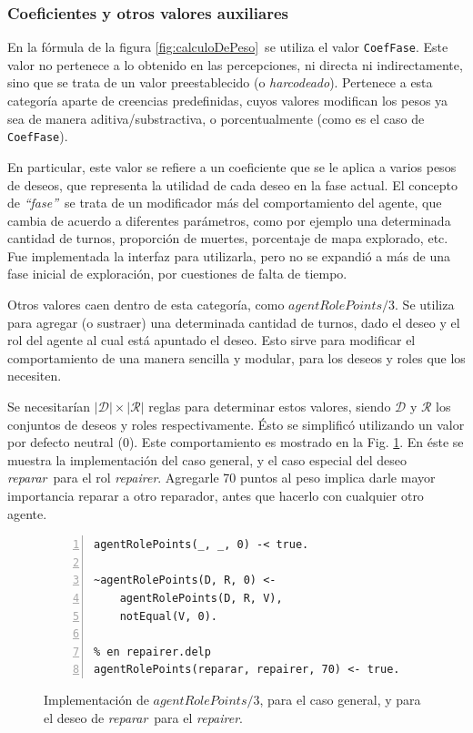 \documentclass[oneside]{book}
\theoremstyle{definition}
\newcommand{\lit}[1]{\mbox{$ #1$}}
\begin{document}
\subsubsection{Coeficientes y otros valores auxiliares}

En la fórmula de la figura \ref{fig:calculoDePeso}\ se utiliza el valor 
\texttt{CoefFase}. Este valor no pertenece a lo obtenido en las percepciones, ni
directa ni indirectamente, sino que se trata de un valor preestablecido (o
\textit{harcodeado}). Pertenece a esta categoría aparte de creencias predefinidas,
cuyos valores modifican los pesos ya sea de manera aditiva/substractiva, o 
porcentualmente (como es el caso de \texttt{CoefFase}).

En particular, este valor se refiere a un coeficiente que se le aplica a varios
pesos de deseos, que representa la utilidad de cada deseo en la fase actual. El 
concepto de \textit{``fase''}\ se trata de un modificador más del comportamiento
del agente, que cambia de acuerdo a diferentes parámetros, como por ejemplo una
determinada cantidad de turnos, proporción de muertes, porcentaje de mapa explorado,
etc. Fue implementada la interfaz para utilizarla, pero no se expandió a más de una
fase inicial de exploración, por cuestiones de falta de tiempo.

Otros valores caen dentro de esta categoría, como \lit{agentRolePoints/3}.
Se utiliza para agregar (o sustraer) una determinada cantidad de turnos, dado el
deseo y el rol del agente al cual está apuntado el deseo. Esto sirve para modificar el 
comportamiento de una manera sencilla y modular, para los deseos y roles que los 
necesiten.

Se necesitarían $|{\mathcal D}| \times |{\mathcal R}|$ reglas para determinar 
estos valores, siendo $\mathcal D$ y $\mathcal R$ los conjuntos de deseos y 
roles respectivamente. Ésto se simplificó utilizando un valor por defecto 
neutral ($0$). Este comportamiento es mostrado en la Fig. 
\ref{fig:agentRolePoints}. En éste se muestra la implementación del caso 
general, y el caso especial del deseo \emph{reparar}\ para el rol 
\emph{repairer}. Agregarle 70 puntos al peso implica darle mayor importancia 
reparar a otro reparador, antes que hacerlo con cualquier otro agente.

\begin{figure}[h]
\begin{Verbatim}[numbers=left]
% en arg.delp
agentRolePoints(_, _, 0) -< true.
	
~agentRolePoints(D, R, 0) <- 
	agentRolePoints(D, R, V),
	notEqual(V, 0).
    
% en repairer.delp
agentRolePoints(reparar, repairer, 70) <- true.
\end{Verbatim}
\caption{Implementación de \lit{agentRolePoints/3}, para el caso general, y para el 
deseo de \emph{reparar}\ para el \emph{repairer}.}
\label{fig:agentRolePoints}
\end{figure}
\end{document}

